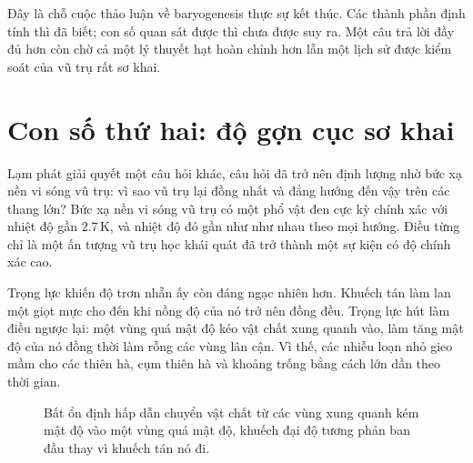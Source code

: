 Đây là chỗ cuộc thảo luận về baryogenesis thực sự kết thúc. Các thành phần định tính thì đã biết; con số quan sát được thì chưa được suy ra. Một câu trả lời đầy đủ hơn còn chờ cả một lý thuyết hạt hoàn chỉnh hơn lẫn một lịch sử được kiểm soát của vũ trụ rất sơ khai.

\section{Con số thứ hai: độ gợn cục sơ khai}

Lạm phát giải quyết một câu hỏi khác, câu hỏi đã trở nên định lượng nhờ bức xạ nền vi sóng vũ trụ: vì sao vũ trụ lại đồng nhất và đẳng hướng đến vậy trên các thang lớn? Bức xạ nền vi sóng vũ trụ có một phổ vật đen cực kỳ chính xác với nhiệt độ gần \(2.7\,\mathrm K\), và nhiệt độ đó gần như như nhau theo mọi hướng. Điều từng chỉ là một ấn tượng vũ trụ học khái quát đã trở thành một sự kiện có độ chính xác cao.

Trọng lực khiến độ trơn nhẵn ấy còn đáng ngạc nhiên hơn. Khuếch tán làm lan một giọt mực cho đến khi nồng độ của nó trở nên đồng đều. Trọng lực hút làm điều ngược lại: một vùng quá mật độ kéo vật chất xung quanh vào, làm tăng mật độ của nó đồng thời làm rỗng các vùng lân cận. Vì thế, các nhiễu loạn nhỏ gieo mầm cho các thiên hà, cụm thiên hà và khoảng trống bằng cách lớn dần theo thời gian.

\begin{figure}[htbp]
\centering
\begin{coursefitfigure}
\end{coursefitfigure}
\caption{Bất ổn định hấp dẫn chuyển vật chất từ các vùng xung quanh kém mật độ vào một vùng quá mật độ, khuếch đại độ tương phản ban đầu thay vì khuếch tán nó đi.}
\label{fig:c08-gravity-growth}
\end{figure}


